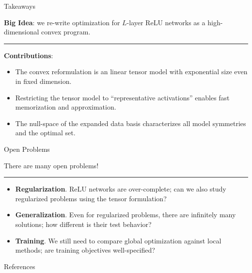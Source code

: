 \documentclass[usenames,dvipsnames,notheorems]{beamer}
\newcommand{\horizontalrule}{
	{
			\vspace{-0.5em}
			\center \rule{\textwidth}{0.1em}
			\vspace{-0.2em}
		}
}
\newcommand{\bad}[1]{\textcolor{bad}{#1}}
\newcommand{\good}[1]{\textcolor{good}{#1}}
\begin{document}
\begin{frame}{Takeaways}

	\textbf{Big Idea}: we re-write optimization for \( L \)-layer ReLU networks
	as a \bad{high-dimensional} \good{convex program}.

	\pause
	\vspace{1ex}
	\horizontalrule
	\vspace{1ex}

	\textbf{Contributions}:
	\vspace{0.5ex}
	\begin{itemize}
		\item The convex reformulation is an \good{linear tensor model}
		      with \bad{exponential size} even in fixed dimension.

		      \pause
		      \vspace{1ex}

		\item Restricting the tensor model to ``representative activations''
		      enables fast \good{memorization} and \good{approximation}.

		      \pause
		      \vspace{1ex}

		\item The null-space of the expanded data basis characterizes
		      all \good{model symmetries} and the \good{optimal set}.
	\end{itemize}
\end{frame}

\begin{frame}{Open Problems}

	\begin{center}
		\Large There are many open problems!
	\end{center}

	\pause
	\vspace{1ex}
	\horizontalrule
	\vspace{1ex}

	\begin{itemize}
		\item \textbf{Regularization}. ReLU networks are
		      \bad{over-complete}; can we also study \good{regularized}  
              problems using the tensor formulation?

		      \pause
		      \vspace{1ex}

		\item \textbf{Generalization}. Even for regularized problems,
		      there are \bad{infinitely many solutions}; how different
		      is their \good{test behavior}?

		      \pause
		      \vspace{1ex}

		\item \textbf{Training}. We still need to compare
		      \good{global optimization} against \bad{local methods};
		      are training objectives \good{well-specified}?
	\end{itemize}
\end{frame}

\begin{frame}[allowframebreaks]{References}
	\printbibliography[]
\end{frame}
\end{document}
